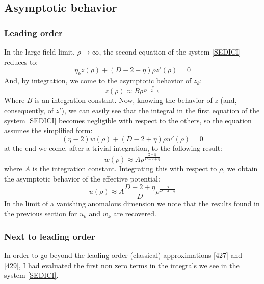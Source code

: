 \subsection{Asymptotic behavior}
\subsubsection{Leading order}
In the large field limit, ${\rho} \to \infty$, the second equation of the system \eqref{SEDICI} reduces to:
\begin{equation}
 \eta_k {z({\rho})} + (D-2+\eta){\rho}{z'({\rho})} = 0
\end{equation}
And, by integration, we come to the asymptotic behavior of $z_k$:
\begin{equation}\label{427}
 z({\rho}) \approx B{\rho}^{\frac{-\eta}{D-2+\eta}}
\end{equation}
Where $B$ is an integration constant.
Now, knowing the behavior of $z$ (and, consequently, of $z'$), we can easily see that the integral in the first equation of the system \eqref{SEDICI} becomes 
negligible with respect to the others, so the equation assumes the simplified form:
\begin{equation}
(\eta -2 )w({\rho}) + (D-2 +\eta){\rho} w'({\rho})=0
\end{equation}
at the end we come, after a trivial integration, to the following result:
\begin{equation}\label{429}
w({\rho}) \approx A{\rho}^\frac{2 - \eta}{D - 2 + \eta}
\end{equation}
where $A$ is the integration constant. 
Integrating this with respect to $\rho$, we obtain the asymptotic behavior of the effective potential:
\begin{equation}
u({\rho}) \approx A\frac{D-2+\eta}{D}{\rho}^\frac{D}{D - 2 + \eta}
\end{equation}
In the limit of a vanishing anomalous dimension we note that the results found in the previous section for $u_k$ and $w_k$ are recovered. 
\subsubsection{Next to leading order}
In order to go beyond the leading order (classical) approximations \eqref{427} and \eqref{429}, I had evaluated the first non zero terms in the 
integrals we see in the system \eqref{SEDICI}. 

